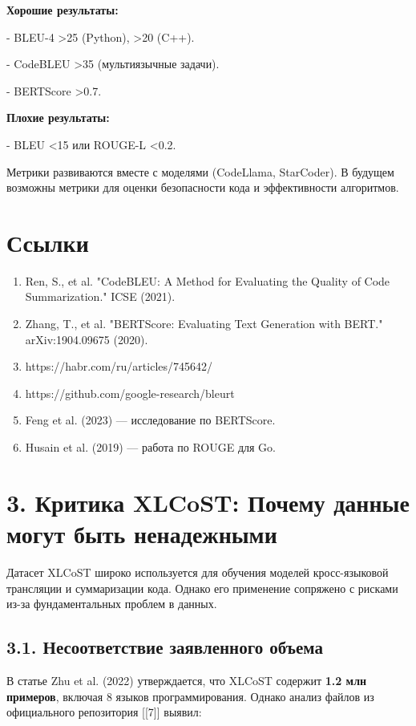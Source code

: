 \documentclass[14pt]{article}
\theoremstyle{definition}
\begin{document}
\textbf{Хорошие результаты:}

    
- BLEU-4 >25 (Python), >20 (C++).
    
- CodeBLEU >35 (мультиязычные задачи).
    
- BERTScore >0.7.


\textbf{Плохие результаты:}

    
- BLEU <15 или ROUGE-L <0.2.


Метрики развиваются вместе с моделями (CodeLlama, StarCoder). В будущем возможны метрики для оценки безопасности кода и эффективности алгоритмов.

\section*{Ссылки}
\begin{enumerate}
    \item Ren, S., et al. "CodeBLEU: A Method for Evaluating the Quality of Code Summarization." ICSE (2021).
    \item Zhang, T., et al. "BERTScore: Evaluating Text Generation with BERT." arXiv:1904.09675 (2020).
    \item https://habr.com/ru/articles/745642/
    \item https://github.com/google-research/bleurt
    \item Feng et al. (2023) — исследование по BERTScore.
    \item Husain et al. (2019) — работа по ROUGE для Go.
\end{enumerate}


\newpage
\section*{3. Критика XLCoST: Почему данные могут быть ненадежными}

Датасет XLCoST широко используется для обучения моделей кросс-языковой трансляции и суммаризации кода. Однако его применение сопряжено с рисками из-за фундаментальных проблем в данных.

\subsection*{3.1. Несоответствие заявленного объема}

В статье Zhu et al. (2022) утверждается, что XLCoST содержит \textbf{1.2 млн примеров}, включая 8 языков программирования. Однако анализ файлов из официального репозитория [[7]] выявил:
\end{document}
